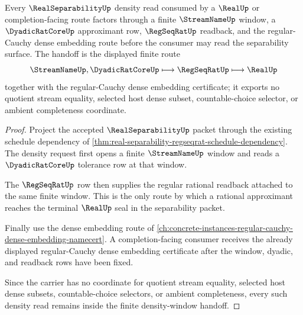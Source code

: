 \begin{theorem}
\label{thm:real-separability-regseqrat-density-window-handoff}
Every $\RealSeparabilityUp$ density read consumed by a $\RealUp$ or completion-facing route factors through a finite $\StreamNameUp$ window, a $\DyadicRatCoreUp$ approximant row, $\RegSeqRatUp$ readback, and the regular-Cauchy dense embedding route before the consumer may read the separability surface. The handoff is the displayed finite route
$$
\StreamNameUp,\DyadicRatCoreUp \longmapsto \RegSeqRatUp \longmapsto \RealUp
$$
together with the regular-Cauchy dense embedding certificate; it exports no quotient stream equality, selected host dense subset, countable-choice selector, or ambient completeness coordinate.
\end{theorem}
\begin{proof}
Project the accepted $\RealSeparabilityUp$ packet through the existing schedule dependency of \autoref{thm:real-separability-regseqrat-schedule-dependency}. The density request first opens a finite $\StreamNameUp$ window and reads a $\DyadicRatCoreUp$ tolerance row at that window.

The $\RegSeqRatUp$ row then supplies the regular rational readback attached to the same finite window. This is the only route by which a rational approximant reaches the terminal $\RealUp$ seal in the separability packet.

Finally use the dense embedding route of \autoref{ch:concrete-instances-regular-cauchy-dense-embedding-namecert}. A completion-facing consumer receives the already displayed regular-Cauchy dense embedding certificate after the window, dyadic, and readback rows have been fixed.

Since the carrier has no coordinate for quotient stream equality, selected host dense subsets, countable-choice selectors, or ambient completeness, every such density read remains inside the finite density-window handoff.
\end{proof}
